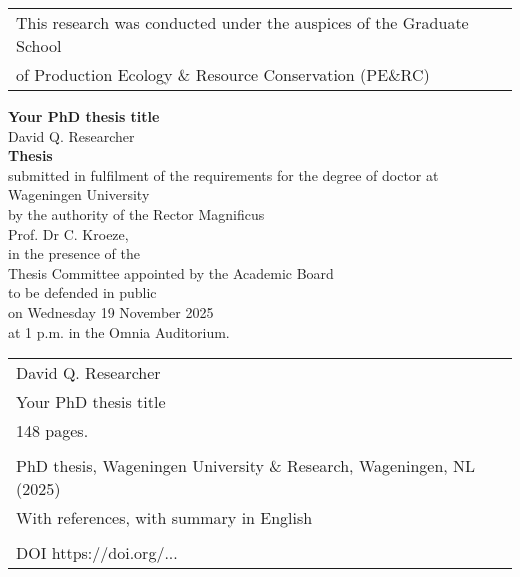 \begin{tabular}{l}
    \small{This research was conducted under the auspices of the Graduate School} \\  
    \small{of Production Ecology \& Resource Conservation (PE$\&$RC)}                         \\  
\end{tabular}

\newpage
\thispagestyle{empty}
\begin{center}
\Huge{\textbf{Your PhD thesis title}} \\
\vspace*{1cm}
\Large{David Q. Researcher}\\
\normalsize
\vspace*{\fill}
\textbf{Thesis} \\
submitted in fulfilment of the requirements for the degree of doctor at \\
Wageningen University\\
by the authority of the Rector Magnificus\\
Prof. Dr C. Kroeze,\\
in the presence of the\\
Thesis Committee appointed by the Academic Board\\
to be defended in public\\
on Wednesday 19 November 2025\\
at 1 p.m. in the Omnia Auditorium.\\
\end{center}

\newpage
\thispagestyle{empty}
\vspace*{\fill}
\begin{flushleft}
\begin{tabular}{l}
    David Q. Researcher                                                 \\  
    Your PhD thesis title                                     \\  
    148 pages.                                               \\  
                                                             \\  
    PhD thesis, Wageningen University \& Research, Wageningen, NL (2025) \\  
    With references, with summary in English     \\  
                                                             \\  
    DOI https://doi.org/...                                           \\  
\end{tabular}
\end{flushleft}
